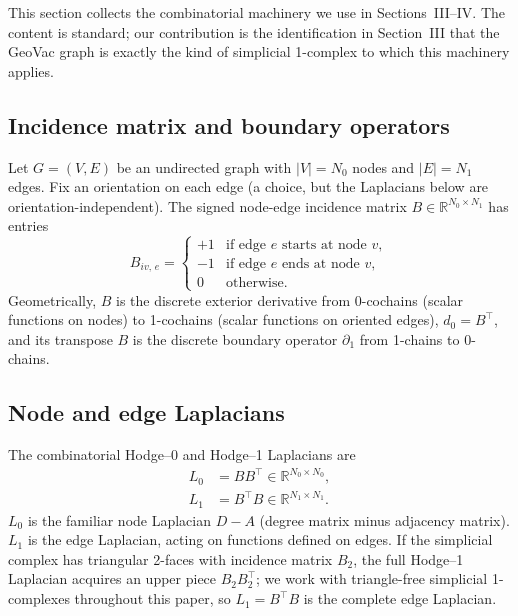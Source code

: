 \documentclass[aps,pra,twocolumn,superscriptaddress,longbibliography]{revtex4-2}
\begin{document}
This section collects the combinatorial machinery we use in
Sections~III--IV.  The content is standard; our contribution is the
identification in Section~III that the GeoVac graph is exactly the
kind of simplicial 1-complex to which this machinery applies.

\subsection{Incidence matrix and boundary operators}

Let $G = (V, E)$ be an undirected graph with $|V| = N_0$ nodes and
$|E| = N_1$ edges.  Fix an orientation on each edge (a choice, but
the Laplacians below are orientation-independent).  The signed
node-edge incidence matrix $B \in \mathbb{R}^{N_0 \times N_1}$ has
entries
\begin{equation}
B_{iv,\, e} =
\begin{cases}
+1 & \text{if edge $e$ starts at node $v$},\\
-1 & \text{if edge $e$ ends at node $v$},\\
0  & \text{otherwise}.
\end{cases}
\label{eq:incidence}
\end{equation}
Geometrically, $B$ is the discrete exterior derivative from 0-cochains
(scalar functions on nodes) to 1-cochains (scalar functions on
oriented edges), $d_0 = B^{\top}$, and its transpose $B$ is the
discrete boundary operator $\partial_1$ from 1-chains to 0-chains.

\subsection{Node and edge Laplacians}

The combinatorial Hodge--0 and Hodge--1 Laplacians
are~\cite{Lim2020,Schaub2020}
\begin{align}
L_0 &= B B^{\top} \in \mathbb{R}^{N_0 \times N_0},
\label{eq:L0}\\
L_1 &= B^{\top} B \in \mathbb{R}^{N_1 \times N_1}.
\label{eq:L1}
\end{align}
$L_0$ is the familiar node Laplacian $D - A$
(degree matrix minus adjacency matrix).  $L_1$ is the edge Laplacian,
acting on functions defined on edges.  If the simplicial complex has
triangular 2-faces with incidence matrix $B_2$, the full Hodge--1
Laplacian acquires an upper piece $B_2 B_2^{\top}$; we work with
triangle-free simplicial 1-complexes throughout this paper, so
$L_1 = B^{\top} B$ is the complete edge Laplacian.
\end{document}
